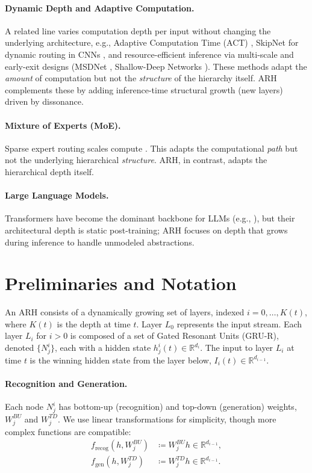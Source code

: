 \documentclass{article}
\numberwithin{figure}{section}
\numberwithin{table}{section}
\numberwithin{algorithm}{section}
\begin{document}
\paragraph{Dynamic Depth and Adaptive Computation.} A related line varies computation depth per input without changing the underlying architecture, e.g., Adaptive Computation Time (ACT) \citep{Graves2016}, SkipNet for dynamic routing in CNNs \citep{Wang2018}, and resource-efficient inference via multi-scale and early-exit designs (MSDNet \citep{Huang2018}, Shallow-Deep Networks \citep{Kaya2019}). These methods adapt the \emph{amount} of computation but not the \emph{structure} of the hierarchy itself. ARH complements these by adding inference-time structural growth (new layers) driven by dissonance.

\paragraph{Mixture of Experts (MoE).} Sparse expert routing scales compute \citep{Shazeer2017, Fedus2022}. This adapts the computational \emph{path} but not the underlying hierarchical \emph{structure}. ARH, in contrast, adapts the hierarchical depth itself.

\paragraph{Large Language Models.} Transformers \citep{Vaswani2017} have become the dominant backbone for LLMs (e.g., \citep{Brown2020}), but their architectural depth is static post-training; ARH focuses on depth that grows during inference to handle unmodeled abstractions.

\section{Preliminaries and Notation}
An ARH consists of a dynamically growing set of layers, indexed $i=0, \dots, K(t)$, where $K(t)$ is the depth at time $t$. Layer $L_0$ represents the input stream. Each layer $L_i$ for $i>0$ is composed of a set of Gated Resonant Units (GRU-R), denoted $\{N_j^i\}$, each with a hidden state $h_j^i(t) \in \mathbb{R}^{d_i}$. The input to layer $L_i$ at time $t$ is the winning hidden state from the layer below, $I_i(t) \in \mathbb{R}^{d_{i-1}}$.

\paragraph{Recognition and Generation.} Each node $N_j^i$ has bottom-up (recognition) and top-down (generation) weights, $W_j^{BU}$ and $W_j^{TD}$. We use linear transformations for simplicity, though more complex functions are compatible:
\begin{align}
    f_{\text{recog}}(h, W_j^{BU}) &\coloneqq W_j^{BU} h \in \mathbb{R}^{d_{i-1}}, \\
    f_{\text{gen}}(h, W_j^{TD}) &\coloneqq W_j^{TD} h \in \mathbb{R}^{d_{i-1}}.
\end{align}
\end{document}
